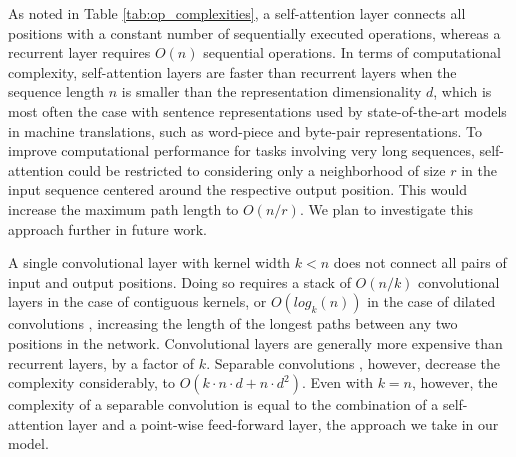 \documentclass{article}
\begin{document}
As noted in Table \ref{tab:op_complexities}, a self-attention layer connects all positions with a constant number of sequentially executed operations, whereas a recurrent layer requires $O(n)$ sequential operations.
In terms of computational complexity, self-attention layers are faster than recurrent layers when the sequence length $n$ is smaller than the representation dimensionality $d$, which is most often the case with sentence representations used by state-of-the-art models in machine translations, such as word-piece \citep{wu2016google} and byte-pair \citep{sennrich2015neural} representations.
To improve computational performance for tasks involving very long sequences, self-attention could be restricted to considering only a neighborhood of size $r$ in the input sequence centered around the respective output position. This would increase the maximum path length to $O(n/r)$. We plan to investigate this approach further in future work.

A single convolutional layer with kernel width $k < n$ does not connect all pairs of input and output positions. Doing so requires a stack of $O(n/k)$ convolutional layers in the case of contiguous kernels, or $O(log_k(n))$ in the case of dilated convolutions \citep{NalBytenet2017}, increasing the length of the longest paths between any two positions in the network.
Convolutional layers are generally more expensive than recurrent layers, by a factor of $k$. Separable convolutions \citep{xception2016}, however, decrease the complexity considerably, to $O(k \cdot n \cdot d + n \cdot d^2)$. Even with $k=n$, however, the complexity of a separable convolution is equal to the combination of a self-attention layer and a point-wise feed-forward layer, the approach we take in our model.



\end{document}
